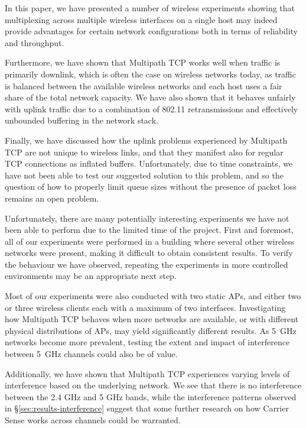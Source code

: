 In this paper, we have presented a number of wireless experiments showing that
multiplexing across multiple wireless interfaces on a single host may indeed
provide advantages for certain network
configurations both in terms of reliability and throughput.

Furthermore, we have shown that Multipath TCP works well when traffic is
primarily downlink, which is often the case on wireless networks today, as 
traffic is balanced between the available wireless networks and each host
uses a fair share of the total network capacity. We have also shown that 
it behaves unfairly with uplink traffic due to a combination of 
802.11 retransmissions and effectively unbounded buffering in the network stack.

Finally, we have discussed how the uplink problems experienced by Multipath TCP
are not unique to wireless links, and that they manifest also for regular TCP
connections as inflated buffers. Unfortunately, due to time constraints, we have 
not been able to test our suggested solution to this problem, and so the 
question of how to properly limit queue sizes without the presence of packet loss 
remains an open problem.

Unfortunately, there
are many potentially interesting experiments we have not been able to perform due to
the limited time of the project. First and foremost, all of our experiments were 
performed in a building where several other wireless networks were present, 
making it difficult to obtain consistent results. To verify the behaviour we 
have observed, repeating the experiments in more controlled environments may be 
an appropriate next step.

Most of our experiments were also conducted with two static APs, and either two 
or three wireless clients each with a maximum of two interfaces. Investigating 
how Multipath TCP behaves when more networks are available, or with different 
physical distributions of APs, may yield significantly different results. 
As 5~GHz networks become more prevalent, testing the extent and impact of interference 
between 5~GHz channels could also be of value. 

Additionally, we have shown that Multipath TCP experiences varying levels of 
interference based on the underlying network. We see that there is no 
interference between the 2.4 GHz and 5 GHz bands, while the interference patterns 
observed in \S\ref{sec:results-interference} suggest that some further research 
on how Carrier Sense works across channels could be warranted.

